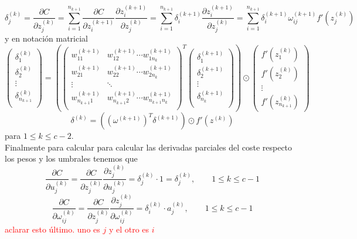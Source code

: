 \documentclass{article}
\begin{document}
$$\delta_j^{(k)}=\frac{\partial C}{\partial z_j^{(k)}}=
\sum_{i=1}^{n_{k+1}} \frac{\partial C}{\partial z_i^{(k+1)}}\frac{\partial z_i^{(k+1)}}{\partial z_j^{(k)}}=
\sum_{i=1}^{n_{k+1}} \delta_i^{(k+1)}\frac{\partial z_i^{(k+1)}}{\partial z_j^{(k)}}=
\sum_{i=1}^{n_{k+1}} \delta_i^{(k+1)}\omega_{ij}^{(k+1)}f'(z_j^{(k)}) $$
y en notación matricial
$$
\begin{pmatrix}
\delta^{(k)}_1 \\
\delta^{(k)}_2 \\
\vdots \\
\delta^{(k)}_{n_{k+1}} \\
\end{pmatrix}
=\left(
\begin{pmatrix}
w^{(k+1)}_{11} & w^{(k+1)}_{12} \cdots w^{(k+1)}_{1n_{k}}\\
w^{(k+1)}_{21} & w^{(k+1)}_{22} \cdots w^{(k+1)}_{2n_{k}}\\
\vdots   & \ddots  \\
w^{(k+1)}_{{n_{k+1}}1} & w^{(k+1)}_{{n_{k+1}}2} \cdots w^{(k+1)}_{{n_{k+1}}n_{k}}\\
\end{pmatrix}^T
\begin{pmatrix}
\delta^{(k+1)}_1 \\
\delta^{(k+1)}_2 \\
\vdots \\
\delta^{(k+1)}_{n_{k}} \\
\end{pmatrix}\right)
\odot
\begin{pmatrix}
f'(z_1^{(k)})\\
f'(z_2^{(k)})\\
\vdots\\
f'(z_{n_{k+1}}^{(k)})
\end{pmatrix}$$
$$\delta^{(k)}=((\omega^{(k+1)})^T\delta^{(k+1)})\odot f'(z^{(k)}) $$
para $1\leq k\leq c-2 $.\\
Finalmente para calcular para calcular las derivadas parciales del coste respecto los pesos y los umbrales tenemos que
$$\frac{\partial C}{\partial u_j^{(k)}}=\frac{\partial C}{\partial z_j^{(k)}}\frac{\partial z_j^{(k)}}{\partial u_j^{(k)}}=\delta_j^{(k)}\cdot 1=\delta_j^{(k)}, \qquad 1\leq k\leq c-1 $$
$$\frac{\partial C}{\partial \omega_{ij}^{(k)}}=\frac{\partial C}{\partial z_j^{(k)} }\frac{\partial z_j^{(k)}}{\partial \omega_{ij}^{(k)}}=\delta_i^{(k)}\cdot a_j^{(k)}, \qquad 1\leq k\leq c-1 $$
\textcolor{red}{aclarar esto último. uno es $j$ y el otro es $i$}
\end{document}
